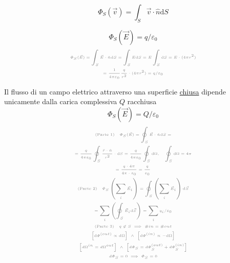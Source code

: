 \begin{multicols}{3}
  \begin{equation}
    \label{eq:flusso}
    \varPhi_S(\vec{v}) = \int_S \vec{v}\cdot\hat{n}\text{d}S
  \end{equation}
  
  \begin{equation}
    \label{eq:flusso-elettrico-semplice}
    \varPhi_S(\vec{E}) = q/\varepsilon_0
  \end{equation}
  \begin{equation*}
    \myproof{
      \begin{gathered}
        \varPhi_S(\vec{E}) =
        \int_S \vec{E}\cdot\hat{n}\text{d}S =
        \int_S E\text{d}S =
        E \int_S \text{d}S =
        E \cdot (4\pi r^2) \\ =
        \frac{1}{4\pi\varepsilon_0}\frac{q}{r^2} \cdot (4\pi r^2) =
        q/\varepsilon_0
      \end{gathered}}
  \end{equation*}

  Il flusso di un campo elettrico attraverso una superficie \underline{chiusa}
  dipende unicamente dalla carica complessiva $Q$ racchiusa
  \begin{equation}
    \label{th:gauss}
    \varPhi_S(\vec{E}) = Q / \varepsilon_0
  \end{equation}
  \begin{equation*}
    \myproof{
      \begin{gathered}
        \text{(Parte 1)} \quad \varPhi_S(\vec{E}) =
        \oint_S \vec{E}\cdot\hat{n}\text{d}S = \\ =
        \frac{q}{4\pi\varepsilon_0} \oint_S \frac{\hat{r}\cdot\hat{n}}{r^2}\cdot\text{d}S =
        \frac{q}{4\pi\varepsilon_0} \oint_S \text{d}\Omega,
        \quad \oint_S \text{d}\Omega = 4\pi\\ =
        \frac{q \cdot 4\pi}{4\pi\cdot\varepsilon_0} = \frac{q}{\varepsilon_0} \\
        \text{(Parte 2)} \quad \varPhi_S\left(\sum_i\vec{E}_i\right) =
        \oint_S \left(\sum_i\vec{E}_i\right)\text{d}\vec{S} \\ =
        \sum_i \left(\oint_S\vec{E}_i\text{d}\vec{S}\right) =
        \sum_i q_i/\varepsilon_0 \\
        \text{(Parte 3)} \quad q \not \in S \implies \#in = \#out\\
        \left[\text{d}\varPhi^{(out)} \propto \text{d}\Omega\right] ~ \wedge ~
        \left[\text{d}\varPhi^{(in)} \propto -\text{d}\Omega\right] \\
        \left[d\Omega^{in} = d\Omega^{out}\right] ~ \wedge ~
        \left[d\varPhi_{S} = d\varPhi_{S}^{(out)} + d\varPhi_{S}^{(in)}\right] \\
        d\varPhi_{S} = 0 \implies \varPhi_{S} = 0
      \end{gathered}
    }
  \end{equation*}

\end{multicols}

